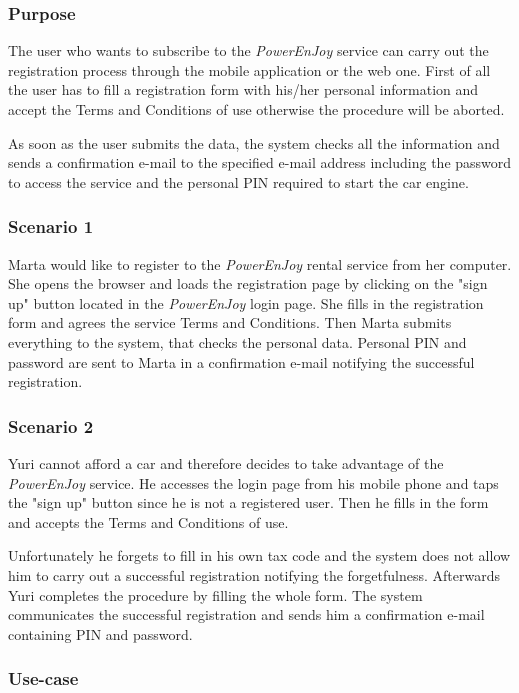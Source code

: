 \subsubsection{Purpose}
The user who wants to subscribe to the \emph{PowerEnJoy} service can carry out the registration process through the mobile application or the web one. First of all the user has to fill a registration form with his/her personal information and accept the Terms and Conditions of use otherwise the procedure will be aborted.

As soon as the user submits the data, the system checks all the information and sends a confirmation e-mail to the specified e-mail address including the password to access the service and the personal PIN required to start the car engine.

\subsubsection{Scenario 1}
Marta would like to register to the \emph{PowerEnJoy} rental service from her computer. She opens the browser and loads the registration page by clicking on the "sign up" button located in the \emph{PowerEnJoy} login page. She fills in the registration form and agrees the service Terms and Conditions. Then Marta submits everything to the system, that checks the personal data. Personal PIN and password are sent to Marta in a confirmation e-mail notifying the successful registration.

\subsubsection{Scenario 2}
Yuri cannot afford a car and therefore decides to take advantage of the \emph{PowerEnJoy} service. He accesses the login page from his mobile phone and taps the "sign up" button since he is not a registered user. Then he fills in the form and accepts the Terms and Conditions of use.

Unfortunately he forgets to fill in his own tax code and the system does not allow him to carry out a successful registration notifying the forgetfulness. Afterwards Yuri completes the procedure by filling the whole form. The system communicates the successful registration and sends him a confirmation e-mail containing PIN and password.

\subsubsection{Use-case}

